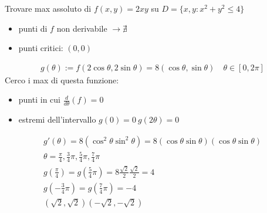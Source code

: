 \documentclass[a4paper, oneside]{article}
\begin{document}
        \begin{example}
            Trovare max assoluto di $f(x,y) = 2xy$ su $D=\{x,y:x^2+y^2\leq 4\}$\\
            \begin{itemize}
                \item punti di $f$ non derivabile $\to \nexists$
                \item punti critici: $(0,0)$
            \end{itemize}
            \begin{gather*}
                g(\theta) := f(2\cos\theta, 2 \sin\theta) = 8(\cos\theta,\sin\theta) \quad \theta \in [0,2\pi]
            \end{gather*}
            Cerco i max di questa funzione:
            \begin{itemize}
                \item punti in cui $\frac{d}{d\theta}(f) = 0$
                \item estremi dell'intervallo $g(0) = 0 \ g(2\theta) = 0$
            \end{itemize}
            \begin{gather*}
                g'(\theta) = 8(\cos^2\theta \sin^2\theta) = 8(\cos\theta\sin\theta)(\cos\theta\sin\theta)\\
                \theta = \frac{\pi}{4},\frac{3}{4}\pi,\frac{5}{4}\pi,\frac{7}{4}\pi\\
                g(\frac{\pi}{4}) = g(\frac{5}{4}\pi) = 8\frac{\sqrt{2}}{2}\frac{\sqrt{2}}{2} = 4\\
                g(-\frac{3}{4}\pi) = g(\frac{7}{4}\pi) = -4\\
                (\sqrt{2},\sqrt{2})(-\sqrt{2},-\sqrt{2})
            \end{gather*}
        \end{example}

        \newpage
\end{document}
